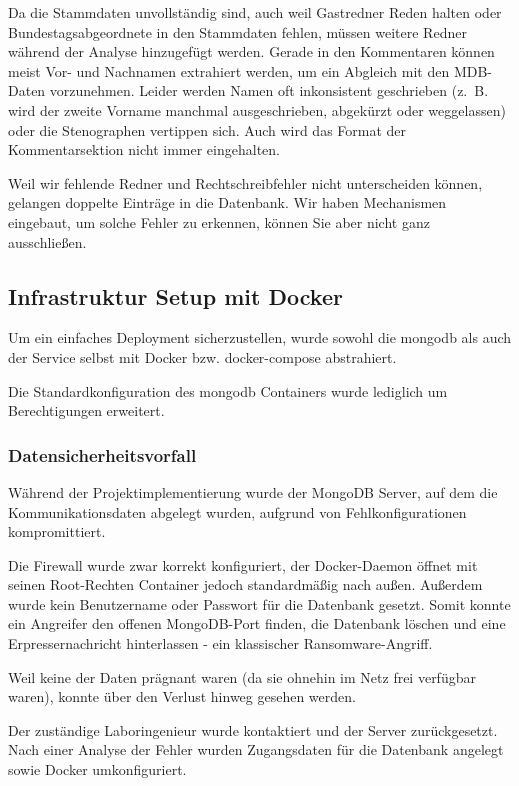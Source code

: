 Da die Stammdaten unvollständig sind, auch weil Gastredner Reden halten oder
Bundestagsabgeordnete in den Stammdaten fehlen, müssen weitere Redner während
der Analyse hinzugefügt werden. Gerade in den Kommentaren können meist Vor-
und Nachnamen extrahiert werden, um ein Abgleich mit den MDB-Daten
vorzunehmen. Leider werden Namen oft inkonsistent geschrieben (z.~B. wird
der zweite Vorname manchmal ausgeschrieben, abgekürzt oder weggelassen) oder
die Stenographen vertippen sich. Auch wird das Format der Kommentarsektion
nicht immer eingehalten.

Weil wir fehlende Redner und Rechtschreibfehler nicht unterscheiden können,
gelangen doppelte Einträge in die Datenbank. Wir haben Mechanismen eingebaut,
um solche Fehler zu erkennen, können Sie aber nicht ganz ausschließen.

\subsection{Infrastruktur Setup mit Docker}
Um ein einfaches Deployment sicherzustellen, wurde sowohl die mongodb als
auch der Service selbst mit Docker bzw. docker-compose abstrahiert.

Die Standardkonfiguration des mongodb Containers wurde lediglich um
Berechtigungen erweitert.

\subsubsection{Datensicherheitsvorfall}

Während der Projektimplementierung wurde der MongoDB Server, auf dem die
Kommunikationsdaten abgelegt wurden, aufgrund von Fehlkonfigurationen
kompromittiert.

Die Firewall wurde zwar korrekt konfiguriert, der Docker-Daemon öffnet mit
seinen Root-Rechten Container jedoch standardmäßig nach außen. Außerdem wurde
kein Benutzername oder Passwort für die Datenbank gesetzt. Somit konnte ein
Angreifer den offenen MongoDB-Port finden, die Datenbank löschen und eine
Erpressernachricht hinterlassen - ein klassischer Ransomware-Angriff.

Weil keine der Daten prägnant waren (da sie ohnehin im Netz frei verfügbar
waren), konnte über den Verlust hinweg gesehen werden.

Der zuständige Laboringenieur wurde kontaktiert und der Server zurückgesetzt.
Nach einer Analyse der Fehler wurden Zugangsdaten für die Datenbank angelegt
sowie Docker umkonfiguriert.

